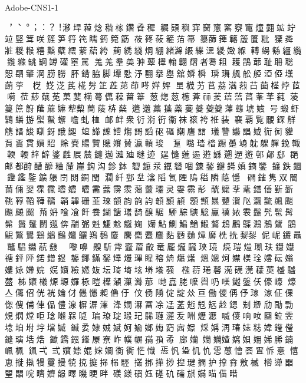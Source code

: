 Adobe-CNS1-1

︐︑︒︔︓︖︕𣻗垾𦻓焾𥟠榢𨯩孴穉
𥣡𩓙穥穽𥦬窻窰竂竃燑𦒍䇊竚
竝竪䇯咲𥰁笋筕笩𥌎𥳾箢筯
莜𥮴𦱿篐萡箒𥴠蒒篺簵𥳁籄粃
𤢂粦𤕸糉糇糦糳糵繧䔝𦹄絝
𦻖綉綫焵綳緖𤁗𦀩緤㴓緵𡟹緥
𨍭𦄡𦅚繮䌫鑬縧罀罁罇礶𦋐駡
羗𦍑羣𡙡𠁨䕜𣝦𨌺翺𦒉者耈耝
耯𪂇𦳃耻耼聡𢜔䦉𦘦𣷣𦛨朥
肧𨩈脇脚墰𢛶汿𦒘擧𡒊舘𡡞橓
𤩥𤪕䑺舩𦩒𣵾俹𡓽蓢荢芑𤦧𣔰
𡝳𣷸芪椛芳䇛蕋苐茚𠸖𡞴㛁
𣅽𣕚艻苢茘𣺋𦶣𦬅𦮗𣗎㶿茝嗬
莅䔋𦶥莬菓𦻔橗蕚㒖𦹂葘𥯤
葱㷓䓤檧葊祘𦮖𦹷𦹃蓞莑䒠蒓
蓤𥲑䉀𥳀䕃蔴嫲䔣䔧蕳䔖枿蘖
𨘥𨘻藁𧂈蘂𡖂𧃍𧃰䕫䕪蘨㙈𡢢
号𧎚虾𪃸蟮𢰧螱蟚蠏噡虬桖
䘏衅衆𧗠𣶹𧗤衞袜䙛袴袵装
𧜏覇覧覼𨨥觧𧤤𧪽誜瞓釾誐𧩙
竩𧬺䜓𧬸煼謌謟𥐰𥕥謿譍誩
𤩺讐讛誯𡛟䘕衏貛𧵔𧶏貫㜥𧵓
賖𧶘𧶽贒贃𡤐賛灜贑㻐起趩𨀂
𡀔𤦊㭼𨆼𧄌竧躭躶軃鋔輙輭
𨍥𨐒辥錃𪊟𠩐辳𨧞𨔽𣶻廸𣉢迹
𢌥㦀𦻗逷𨔼𧪾遡𨕬𨘋邨𨜓郄
𨛦邮都酧醩釄粬𨤳𡺉鈎沟鉁鉢
𥖹𨫆𣲛𨬌𥗛𠴱錬鍫𨫡𨯫嫃𨫢𨫥
䥥鉄𨯬𨰹𨯿鍳鑛躼閅閦鐦閠
濶䊹𨛘𡉼𣸮䧟氜陻隖䅬隣𦻕懚
磵𨫠隽双䦡𦲸𠉴𦐐𩂯𩃥𤫑𡤕
𣌊霱虂霶䨏䔽䖅𤫩灵孁霛𩇕
靗孊𩇫靟鐥僐𣂷𣂼鞉鞟鞱鞾韀
韒韠𥑬韮琜𩐳韵𩐝𧥺䫑頴頳
顋顦㬎𧅵㵑𠘰𤅜𥜆飊颷飈飇䫿
𦴧𡛓喰飡飦飬鍸餹𤨩䭲𩡗𩤅
駵騌騻騐驘𥜥㛄𩂱𩯕髠髢𩬅髴
䰎鬔鬭𨘀倴鬴㣃𣁽魐魀𩴾婅
𡡣鮎鰂鯿鰌𩹨鷔𩾷𪆒𪆫𪃡𪄣𪇟
鵾鶃𪄴鸎鷄𪆓𪈠𡤻𪈳鴹𪂹𪊴
麐麕麞麢䴴麪麯𤍤黁㭠㧥㴝𪏭
伲㞾𨰫鼂鼈䮖鐤𦶢鼗鼖鼹嚟嚊
齅馸𩂋韲葿齩竜龎爖䮾𤥵𤦻
煷𤧸𤍈𤩑玞𨯚𡣺禟𨥾𨸶鍩鏳𨩄
鋬鎁鏋𨥬𤒹爗㻫睲穃烐𤑳𤏸
煾𡟯炣𡢾𣖙㻇𡢅𥐯𡟸㜢𡛻𡠹㛡
𡝴𡣑𥽋㜣𡛀坛𤨥𡏾𡊨𡏆𡒶蔃
𣚦葕𤦔𧅥𣸱𥕜𣻻𧁒䓴𣛮𩦝𦼦
柹㜳㰕㷧塬𡤢栐䁗𣜿𤃡𤂋𤄏𦰡
哋嚞𦚱嚒𠿟𠮨𠸍𨬓鎜仸儫㠙
𤐶亼𠑥佋侊𥙑婨𠆫𠏋㦙𠌊𠐔㐵
伩𠋀𨺳𠉵諚𠈌亘働儍侢伃𤨎
𣺊佂倮偬傁俌俥偘僼湶𣖕𣸹𣺿
浲𡢄𣺉冨凃𠗠䓝𠒣𠒒𠒑赺𨪜
𠜎剙劤𠡳勡䙺熌𤎌𠰠𤦬𡃤槑𠸝
㻞璙琔瑖玘䮎𤪼𤂍叐㖄爏𤃉
喴𠍅响𠯆圝鉝雴埝垍坿㘾壋媙
𨩆𡛺𡝯𡜐娬妸婾嫏娒𥥆𡧳𡡡
𤊕㛵洅瑃娡𥺃媁𨯗𠐓鏠璌𡌃焅
䥲鐈𨧻鎽㞠尞岞幞幈𡦖𡥼𣫮
廍孏𡤃𡤄㜁𡢠㛝𡛾㛓脪𨩇𡶺𣑲
𨦨弌弎𡤧𡞫婫𡜻孄𧗽衠恾𢡠
𢘫忛㺸𢖯𢖾𩂈𦽳懀𠀾𠁆𢘛憙
憘恵𢲛𢴇𤛔𩅍摱𤙥𢭪㨩𢬢𣑐𩣪
𢹸挷撶挱揑𤧣𢵧护𢲡搻敫楲
㯴𣂎𣊭𤦉𣊫唍𣋠𡣙𩐿曎𣊉𣆳㫠
𥖄𨬢𥖏𡛼𥕛𥐥磮𣄃𡠪𣈴㑤𣈏
